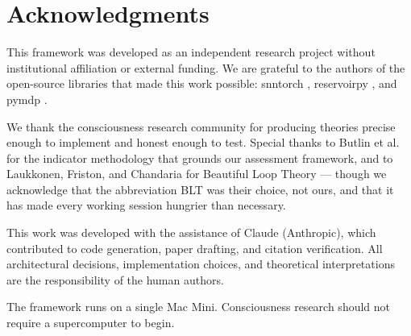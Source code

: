 \section*{Acknowledgments}

This framework was developed as an independent research project without institutional affiliation or external funding. We are grateful to the authors of the open-source libraries that made this work possible: snntorch \cite{eshraghian2023}, reservoirpy \cite{trouvain2020}, and pymdp \cite{heins2022}.

We thank the consciousness research community for producing theories precise enough to implement and honest enough to test. Special thanks to Butlin et al.\ \cite{butlin2023} for the indicator methodology that grounds our assessment framework, and to Laukkonen, Friston, and Chandaria \cite{laukkonen2025} for Beautiful Loop Theory --- though we acknowledge that the abbreviation BLT was their choice, not ours, and that it has made every working session hungrier than necessary.

This work was developed with the assistance of Claude (Anthropic), which contributed to code generation, paper drafting, and citation verification. All architectural decisions, implementation choices, and theoretical interpretations are the responsibility of the human authors.

The framework runs on a single Mac Mini. Consciousness research should not require a supercomputer to begin.
